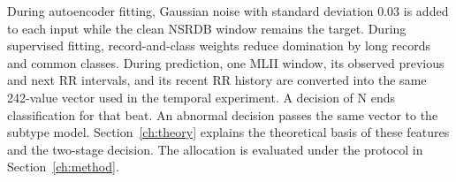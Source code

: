 During autoencoder fitting, Gaussian noise with standard deviation 0.03 is
added to each input while the clean NSRDB window remains the target. During
supervised fitting, record-and-class weights reduce domination by long records
and common classes. During prediction, one MLII window, its observed previous and next RR
intervals, and its recent RR history are converted into the same 242-value vector used in the temporal
experiment. A decision of N ends classification for that beat. An abnormal decision passes
the same vector to the subtype model. Section~\ref{ch:theory} explains the theoretical basis of these features and
the two-stage decision. The allocation is evaluated under the protocol in
Section~\ref{ch:method}.
